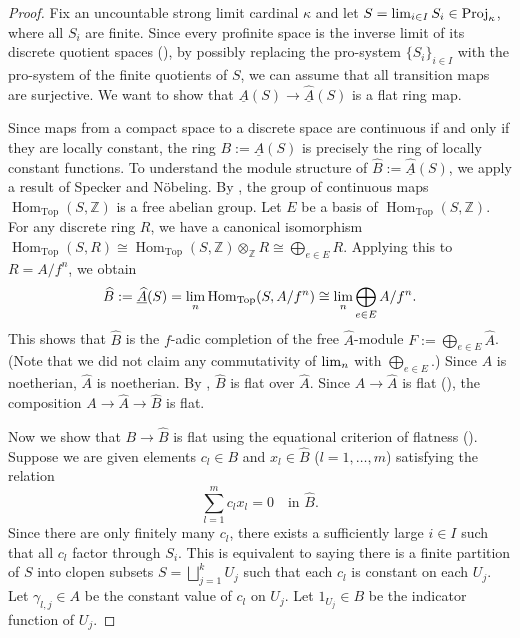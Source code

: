 \documentclass[11pt]{amsart}
\newcommand{\eq}[2]{\begin{equation}\label{#1}#2 \end{equation}}
\newcommand{\ra}{\rightarrow} %
\newcommand{\Z}{\mathbb{Z}}
\newcommand{\Hom}{\operatorname{Hom}}
\newcommand{\Top}{\operatorname{Top}}
\renewcommand{\lim}{\operatornamewithlimits{\rm{lim}}}
\newcommand{\colim}{\operatornamewithlimits{\rm{colim}}}
\newcommand{\Proj}{\operatorname{Proj}}
\renewcommand{\hat}{\widehat} %
\newcommand{\ul}{\underline}
\theoremstyle{plain}
\theoremstyle{definition}
\numberwithin{equation}{prop}
\begin{document}
\begin{proof}
Fix an  uncountable strong limit cardinal $\kappa$ and let $S=\lim_{i\in I} S_i\in \Proj_\kappa$, where all $S_i$ are finite.
Since every profinite space is the inverse limit of its discrete quotient spaces (\cite[Proposition 1.1.7]{Wilson}), by possibly replacing the pro-system $\{S_i\}_{i\in I}$ with the pro-system of the finite quotients of $S$, we can assume that all transition maps are surjective.
We want to show that $\ul A(S)\ra \ul{\hat A}(S)$ is a flat ring map.

Since maps from a compact space to a discrete space are continuous if and only if they are locally constant, the ring $B := \ul{A}(S)$ is precisely the ring of locally constant functions.
To understand the module structure of $\widehat{B}:= \ul{\widehat{A}}(S)$, we apply a result of Specker and N\"obeling. 
By \cite[Theorem 5.4]{CS}, the group of continuous maps $\Hom_{\Top}(S, \Z)$ is a free abelian group. Let $E$ be a basis of $\Hom_{\Top}(S, \Z)$. For any discrete ring $R$, we have a canonical isomorphism $\Hom_{\Top}(S, R) \cong \Hom_{\Top}(S, \Z) \otimes_{\Z} R \cong \bigoplus_{e \in E} R$. 
Applying this to $R = A/f^n$, we obtain
\[
\widehat{B} := \ul{\widehat{A}}(S) = \lim_n \Hom_{\Top}(S, A/f^n) \cong \lim_n \bigoplus_{e \in E} A/f^n.
\]
This shows that $\widehat{B}$ is the $f$-adic completion of the free $\widehat{A}$-module $F := \bigoplus_{e \in E} \widehat{A}$. 
(Note that we did not claim any commutativity of $\lim_n$ with $\bigoplus_{e\in E}$.)
Since $A$ is noetherian, $\widehat{A}$ is noetherian. 
By \cite[\href{https://stacks.math.columbia.edu/tag/06LE}{Tag 06LE}]{stacks-project},
$\widehat{B}$ is flat over $\widehat{A}$. 
Since $A \to \widehat{A}$ is flat (\cite[Thm 8.8]{Matsumura}), the composition $A \to \widehat{A} \to \widehat{B}$ is flat.

Now we show that $B \to \widehat{B}$ is flat using the equational criterion of flatness (\cite[\href{https://stacks.math.columbia.edu/tag/00HK}{Tag 00HK}]{stacks-project}). Suppose we are given elements $c_l \in B$ and $x_l \in \widehat{B}$ ($l = 1, \dots, m$) satisfying the relation
\eq{flat1}{
\sum_{l=1}^m c_l x_l = 0 \quad \text{in } \widehat{B}.
}
Since there are only finitely many $c_l$, there exists a sufficiently large $i \in I$ such that all $c_l$ factor through $S_i$. This is equivalent to saying there is a finite partition of $S$ into clopen subsets $S = \bigsqcup_{j=1}^k U_j$ such that each $c_l$ is constant on each $U_j$. Let $\gamma_{l,j} \in A$ be the constant value of $c_l$ on $U_j$. Let $1_{U_j} \in B$ be the indicator function of $U_j$. 


\end{proof}
\end{document}
